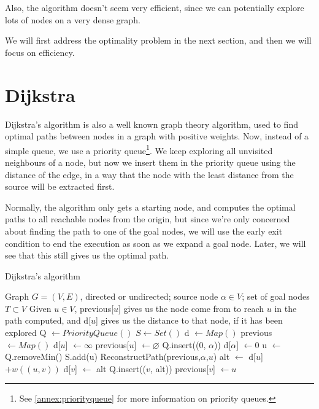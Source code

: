 \documentclass[12pt]{report}
\begin{document}
Also, the algorithm doesn't seem very efficient, since we can potentially explore lots of nodes on a very dense graph.

We will first address the optimality problem in the next section, and then we will focus on efficiency.


\section{Dijkstra}
Dijkstra's algorithm is also a well known graph theory algorithm, used to find optimal paths between nodes in a graph with positive weights. Now, instead of a simple queue, we use a priority queue\footnote{See \ref{annex:priorityqueue} for more information on priority queues.}. We keep exploring all unvisited neighbours of a node, but now we insert them in the priority queue using the distance of the edge, in a way that the node with the least distance from the source will be extracted first.

Normally, the algorithm only gets a starting node, and computes the optimal paths to all reachable nodes from the origin, but since we're only concerned about finding the path to one of the goal nodes, we will use the early exit condition to end the execution as soon as we expand a goal node. Later, we will see that this still gives us the optimal path.

\begin{algorithm}
\caption{Dijkstra's algorithm}
\label{alg:dijkstra}
\begin{algorithmic}[1]
\Require Graph $G = (V, E)$, directed or undirected; source node $\alpha \in V$; set of goal nodes $T \subset V$
\Ensure Given $u \in V$, previous[$u$] gives us the node come from to reach $u$ in the path computed, and d[$u$] gives us the distance to that node, if it has been explored
\State Q $\gets PriorityQueue()$
\State $S \gets Set()$
\State d $\gets Map()$ 
\State previous $\gets Map()$
	\State d[$u$] $\gets \infty$
	\State previous[$u$] $\gets \varnothing$
\EndFor
\State Q.insert((0, $\alpha$))
\State d[$\alpha$] $\gets 0$
	\State u $\gets$ Q.removeMin()
	\State S.add(u)
	 
		\State \Return ReconstructPath(previous,$\alpha$,$u$)
	\EndIf
			\Continue {}
		\EndIf
		\State alt $\gets$ d[$u$] $+ w((u, v))$
			\State d[$v$] $\gets$ alt
			\State Q.insert(($v$, alt))
			\State previous[$v$] $\gets u$
		\EndIf
	\EndFor
\EndWhile
\EndProcedure
\end{algorithmic}
\end{algorithm}
\end{document}
